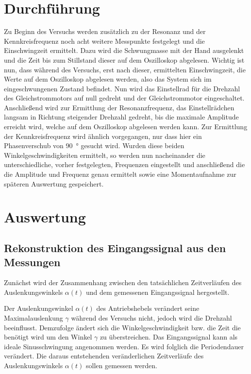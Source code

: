 \documentclass[a4paper,12pt]{scrartcl}
\begin{document}
\section{Durchführung}
Zu Beginn des Versuchs werden zusätzlich zu der Resonanz und der Kennkreisfrequenz noch acht weitere Messpunkte festgelegt und die Einschwingzeit ermittelt.
Dazu wird die Schwungmasse mit der Hand ausgelenkt und die Zeit bis zum Stillstand dieser auf dem Oszilloskop abgelesen. Wichtig ist nun, dass während des
Versuchs, erst nach dieser, ermittelten Einschwingzeit, die Werte auf dem Oszilloskop abgelesen werden, also das System sich im eingeschwungenen Zustand
befindet. Nun wird das Einstellrad für die Drehzahl des Gleichstrommotors auf null gedreht und der Gleichstrommotor eingeschaltet. Anschließend wird zur
Ermittlung der Resonanzfrequenz, das Einstellrädchen langsam in Richtung steigender Drehzahl gedreht, bis die maximale Amplitude erreicht wird, welche auf
dem Oszilloskop abgelesen werden kann. Zur Ermittlung der Kennkreisfrequenz wird ähnlich vorgegangen, nur dass hier ein Phasenverschub von  \SI{90}{\degree} gesucht wird.
Wurden diese beiden Winkelgeschwindigkeiten ermittelt, so werden nun nacheinander die unterschiedliche, vorher festgelegten, Frequenzen eingestellt und
anschließend die die Amplitude und Frequenz  genau ermittelt sowie eine Momentaufnahme zur späteren Auswertung gespeichert.
\section{Auswertung}

\subsection{Rekonstruktion des Eingangssignal aus den Messungen}

Zunächst wird der Zusammenhang zwischen den tatsächlichen Zeitverläufen des Auslenkungswinkels $\alpha \left( t \right)$ und dem gemessenen Eingangssignal hergestellt.

Der Auslenkungswinkel $\alpha \left( t \right)$ des Antriebshebels verändert seine Maximalauslenkung $\gamma$ während des Versuchs nicht, jedoch wird die Drehzahl beeinflusst.
Demzufolge ändert sich die Winkelgeschwindigkeit bzw. die Zeit die benötigt wird um den Winkel $\gamma$ zu überstreichen.
Das Eingangssignal kann als ideale Sinusschwingung angenommen werden.
Es wird folglich die Periodendauer verändert. Die daraus entstehenden veränderlichen Zeitverläufe des Auslenkungswinkels $\alpha \left( t \right)$ sollen gemessen werden.
\end{document}
